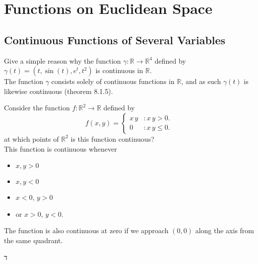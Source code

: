 \documentclass[12pt]{book}
\newcommand{\R}{\mathbb{R}}
\newenvironment{exercise}[2][Exercise]{\begin{trivlist}
\item[\hskip \labelsep {\bfseries #1}\hskip \labelsep {\bfseries #2.}]}{\end{trivlist}}
\begin{document}
\chapter{Functions on Euclidean Space}
\section{Continuous Functions of Several Variables}


\begin{exercise}{8.1.2}
Give a simple reason why the function $\gamma : \R \to \R^4 $ defined by $\gamma (t) = \left( t, \sin(t), e^t, t^2 \right) $ is continuous in $\R$. \\

The function $\gamma$ consists solely of continuous functions in $\R$, and as such $\gamma(t)$ is likewise continuous (theorem 8.1.5).
\end{exercise}


\begin{exercise}{8.1.4}
Consider the function $f:\R^2  \to \R $ defined by  
    \[ f(x,y) = \left\{
     \begin{array}{lr}
       x \, y & : x \, y > 0.\\
       0 & : x \, y \leq 0.
     \end{array}
   \right. \]
   at which points of $\R^2$ is this function continuous? \\
   
   
    This function is continuous whenever
    \begin{itemize}
        \item $x,y >0$ 
        \item $x,y < 0$
        \item $x < 0$, $y > 0$
        \item or $x > 0$, $y < 0.$
    \end{itemize}
    The function is also continuous at zero if we approach $(0,0)$ along the axis from the same quadrant.
\end{exercise}
ד
\end{document}
